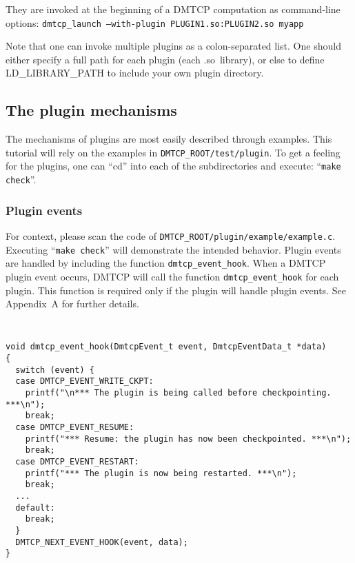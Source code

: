 \documentclass{article}
\begin{document}
They are invoked at the beginning of a DMTCP computation
as command-line options:
\hfill\break
\medskip\noindent
  \hspace{0.3truein} {\tt dmtcp\_launch --with-plugin PLUGIN1.so:PLUGIN2.so
			  myapp}
\medskip

Note that one can invoke multiple plugins as a colon-separated list.
One should either specify a full path for each plugin (each .so~library),
or else to define LD\_LIBRARY\_PATH to include your own plugin directory.

\subsection{The plugin mechanisms}

The mechanisms of plugins are most easily described through examples.
This tutorial will rely on the examples in {\tt DMTCP\_ROOT/test/plugin}.
To get a feeling for the plugins, one can ``cd'' into each of the
subdirectories and execute: ``{\tt make check}''.

\subsubsection{Plugin events}

For context, please scan the code of {\tt DMTCP\_ROOT/plugin/example/example.c}.
Executing ``{\tt make check}'' will demonstrate the intended behavior.
Plugin events are handled by including the function {\tt dmtcp\_event\_hook}.
When a DMTCP plugin event occurs, DMTCP will call the
function {\tt dmtcp\_event\_hook} for each plugin.
This function is required only if the plugin will handle plugin events.
See Appendix~A for further details.

{\tt
\begin{verbatim}
void dmtcp_event_hook(DmtcpEvent_t event, DmtcpEventData_t *data)
{
  switch (event) {
  case DMTCP_EVENT_WRITE_CKPT:
    printf("\n*** The plugin is being called before checkpointing. ***\n");
    break;
  case DMTCP_EVENT_RESUME:
    printf("*** Resume: the plugin has now been checkpointed. ***\n");
    break;
  case DMTCP_EVENT_RESTART:
    printf("*** The plugin is now being restarted. ***\n");
    break;
  ...
  default:
    break;
  }
  DMTCP_NEXT_EVENT_HOOK(event, data);
}
\end{verbatim}
}
\end{document}

